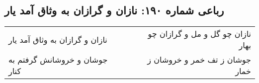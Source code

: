 \begin{center}
\section*{رباعی شماره ۱۹۰: نازان و گرازان به وثاق آمد یار}
\label{sec:sh190}
\begin{longtable}{l p{0.5cm} r}
نازان و گرازان به وثاق آمد یار
&&
نازان چو گل و مل و گرازان چو بهار
\\
جوشان و خروشانش گرفتم به کنار
&&
جوشان ز تف خمر و خروشان ز خمار
\\
\end{longtable}
\end{center}
